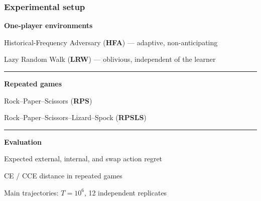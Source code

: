 \begin{frame}
  \frametitle{Experimental setup}

  \vspace{0.1cm}

  \hspace*{-0.01\textwidth}%
  \begin{minipage}{1.02\textwidth}

  \small

  {\bfseries One-player environments}\par
  \vspace{0.2cm}

  Historical-Frequency Adversary (\textbf{HFA})
  --- adaptive, non-anticipating\par
  \vspace{0.06cm}

  Lazy Random Walk (\textbf{LRW})
  --- oblivious, independent of the learner

  \vspace{0.02cm}
  \textcolor{TUMblue}{\rule{\linewidth}{0.35pt}}
  \vspace{-0.3cm}

  {\bfseries Repeated games}\par
  \vspace{0.2cm}

  Rock--Paper--Scissors (\textbf{RPS})\par
  \vspace{0.06cm}

  Rock--Paper--Scissors--Lizard--Spock (\textbf{RPSLS})\par

  \vspace{0.02cm}
  \textcolor{TUMblue}{\rule{\linewidth}{0.35pt}}
  \vspace{-0.3cm}

  {\bfseries Evaluation}\par
  \vspace{0.2cm}

  Expected external, internal, and swap action regret\par
  \vspace{0.06cm}

  CE / CCE distance in repeated games\par
  \vspace{0.06cm}

  Main trajectories: \(T = 10^6\), 12 independent replicates

  \end{minipage}

\end{frame}
